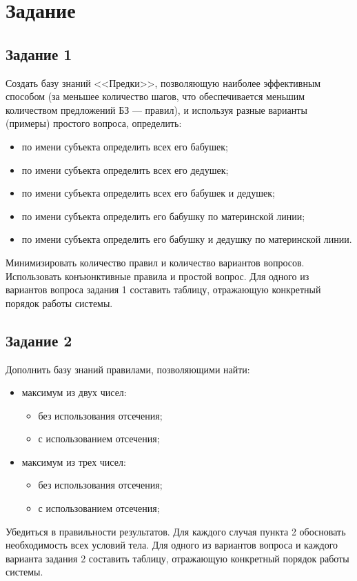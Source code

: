 \section{Задание}
\subsection{Задание 1}
Создать базу знаний <<Предки>>, позволяющую наиболее эффективным способом 
(за меньшее количество шагов, что обеспечивается меньшим количеством предложений БЗ --- правил), 
и используя разные варианты (примеры) простого вопроса, определить:
\begin{itemize}
    \item по имени субъекта определить всех его бабушек;
    \item по имени субъекта определить всех его дедушек;
    \item по имени субъекта определить всех его бабушек и дедушек;
    \item по имени субъекта определить его бабушку по материнской линии;
    \item по имени субъекта определить его бабушку и дедушку по материнской линии.
\end{itemize}

Минимизировать количество правил и количество вариантов вопросов. 
Использовать конъюнктивные правила и простой вопрос. Для одного из 
вариантов вопроса задания 1 составить таблицу, отражающую конкретный 
порядок работы системы.

\subsection{Задание 2}
Дополнить базу знаний правилами, позволяющими найти:
\begin{itemize}
    \item максимум из двух чисел:
    \begin{itemize}
        \item без использования отсечения;
        \item с использованием отсечения;
    \end{itemize}
    \item максимум из трех чисел:
    \begin{itemize}
        \item без использования отсечения;
        \item с использованием отсечения;
    \end{itemize}
\end{itemize}

Убедиться в правильности результатов. Для каждого случая пункта 2 
обосновать необходимость всех условий тела. Для одного из вариантов 
вопроса и каждого варианта задания 2 составить таблицу, отражающую 
конкретный порядок работы системы.
